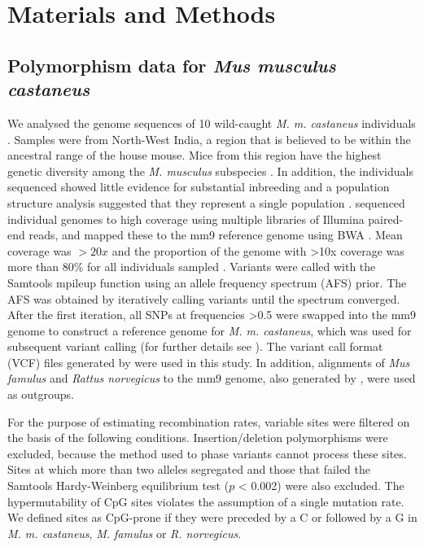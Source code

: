 \section{Materials and Methods}
 
\subsection{Polymorphism data for \textit{Mus musculus castaneus}}
 
We analysed the genome sequences of 10 wild-caught \textit{M. m. castaneus} individuals \citep{RN122}. Samples were from North-West India, a region that is believed to be within the ancestral range of the house mouse. Mice from this region have the highest genetic diversity among the \textit{M. musculus} subspecies \citep{RN233}. In addition, the individuals sequenced showed little evidence for substantial inbreeding and a population structure analysis suggested that they represent a single population \citep{RN158}. \cite{RN122} sequenced individual genomes to high coverage using multiple libraries of Illumina paired-end reads, and mapped these to the mm9 reference genome using BWA \citep{RN251}. Mean coverage was $>20x$ and the proportion of the genome with >10x coverage was more than 80\% for all individuals sampled \citep{RN122}. Variants were called with the Samtools mpileup function \citep{RN252} using an allele frequency spectrum (AFS) prior. The AFS was obtained by iteratively calling variants until the spectrum converged. After the first iteration, all SNPs at frequencies >0.5 were swapped into the mm9 genome to construct a reference genome for \textit{M. m. castaneus}, which was used for subsequent variant calling (for further details see \citealt{RN122}). The variant call format (VCF) files generated by \cite{RN122} were used in this study. In addition, alignments of \textit{Mus famulus} and \textit{Rattus norvegicus} to the mm9 genome, also generated by \cite{RN122}, were used as outgroups.
 
	For the purpose of estimating recombination rates, variable sites were filtered on the basis of the following conditions. Insertion/deletion polymorphisms were excluded, because the method used to phase variants cannot process these sites. Sites at which more than two alleles segregated and those that failed the Samtools Hardy-Weinberg equilibrium test ($p$ < 0.002) were also excluded. The hypermutability of CpG sites violates the assumption of a single mutation rate. We defined sites as CpG-prone if they were preceded by a C or followed by a G in \textit{M. m. castaneus}, \textit{M. famulus} or \textit{R. norvegicus}. 
 
